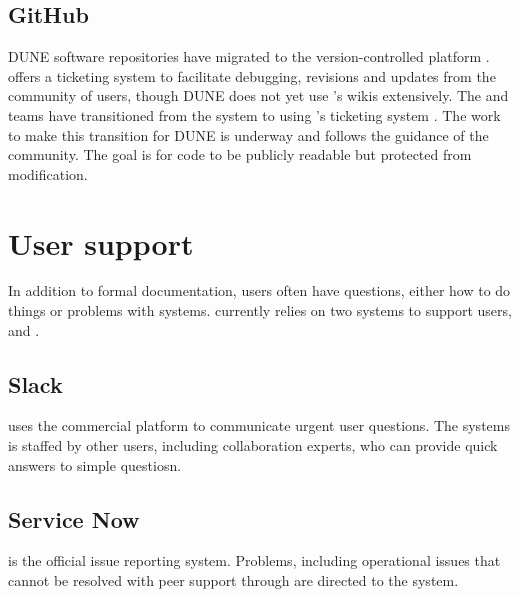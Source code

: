\documentclass[../main-v1.tex]{subfiles}
\begin{document}
\subsection{GitHub}
DUNE software repositories have migrated to the version-controlled platform .   offers a ticketing system to facilitate debugging, revisions and updates from the community of users, though DUNE does not yet use 's wikis extensively.  The  and  teams have transitioned from the  system to using 's ticketing system .  The work to make this transition for DUNE is underway and follows the guidance of the  community. %
The goal is for code to be publicly readable but protected from modification. 

\section{User support}

In addition to formal documentation, users often have questions, either how to do things or problems with systems.   currently relies on two systems to support users,  and .  

\subsection{Slack}
 uses the commercial  platform to communicate urgent user questions.  The  systems is staffed by other users, including collaboration experts, who can provide quick answers to simple questiosn. 

\subsection{Service Now}
 is the official  issue reporting system. Problems, including operational issues that cannot be resolved with peer support through  are directed to the  system.
\end{document}
